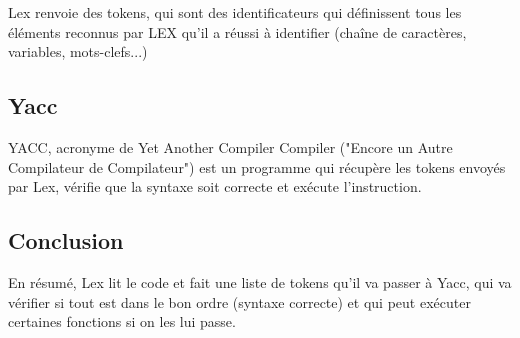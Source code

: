 \documentclass[a4paper,12pt]{article}
\begin{document}
Lex renvoie des tokens, qui sont des identificateurs qui définissent tous les éléments reconnus par LEX qu'il a réussi à identifier (chaîne de caractères, variables, mots-clefs...)

\subsection{Yacc}

YACC, acronyme de Yet Another Compiler Compiler ("Encore un Autre Compilateur de Compilateur") est un programme qui récupère les tokens envoyés par Lex, vérifie que la syntaxe soit correcte et exécute l'instruction.

\subsection{Conclusion}

En résumé, Lex lit le code et fait une liste de tokens qu'il va passer à Yacc, qui va vérifier si tout est dans le bon ordre (syntaxe correcte) et qui peut exécuter certaines fonctions si on les lui passe.
\end{document}
